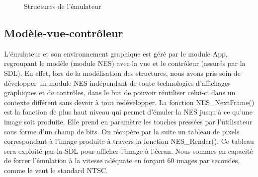 \begin{figure}[H]
	\centering
  \hspace{2cm}
  \caption{Structures de l'émulateur}
  \label{fig:structure}
\end{figure}

\paragraph{}

\subsection{Modèle-vue-contrôleur}

L’émulateur et son environnement graphique est géré par le module App, regroupant le modèle (module NES) avec la vue et le contrôleur (assurés par la SDL). En effet, lors de la modélisation des structures, nous avons pris soin de développer un module NES indépendant de toute technologies d'affichages graphiques et de contrôles, dans le but de pouvoir réutiliser celui-ci dans un contexte différent sans devoir à tout redévelopper. La fonction NES\_NextFrame() est la fonction de plus haut niveau qui permet d'émuler la NES jusqu’à ce qu'une image soit produite. Elle prend en paramètre les touches pressées par l'utilisateur sous forme d'un champ de bits. On récupère par la suite un tableau de pixels correspondant à l'image produite à travers la fonction NES\_Render(). Ce tableau sera exploité par la SDL pour afficher l'image à l'écran. Nous sommes en capacité de forcer l'émulation à la vitesse adéquate en forçant 60 images par secondes, comme le veut le standard NTSC.

